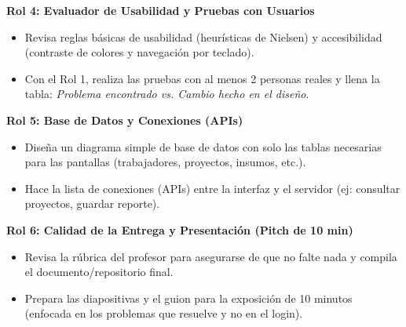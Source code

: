 \documentclass[11pt,letterpaper]{article}
\begin{document}
\begin{tcolorbox}
    \textbf{\color{primary}Rol 4: Evaluador de Usabilidad y Pruebas con Usuarios}
    \begin{itemize}
        \item Revisa reglas básicas de usabilidad (heurísticas de Nielsen) y accesibilidad (contraste de colores y navegación por teclado).
        \item Con el Rol 1, realiza las pruebas con al menos 2 personas reales y llena la tabla: \emph{Problema encontrado vs. Cambio hecho en el diseño}.
    \end{itemize}
\end{tcolorbox}

\begin{tcolorbox}
    \textbf{\color{primary}Rol 5: Base de Datos y Conexiones (APIs)}
    \begin{itemize}
        \item Diseña un diagrama simple de base de datos con solo las tablas necesarias para las pantallas (trabajadores, proyectos, insumos, etc.).
        \item Hace la lista de conexiones (APIs) entre la interfaz y el servidor (ej: consultar proyectos, guardar reporte).
    \end{itemize}
\end{tcolorbox}

\begin{tcolorbox}
    \textbf{\color{primary}Rol 6: Calidad de la Entrega y Presentación (Pitch de 10 min)}
    \begin{itemize}
        \item Revisa la rúbrica del profesor para asegurarse de que no falte nada y compila el documento/repositorio final.
        \item Prepara las diapositivas y el guion para la exposición de 10 minutos (enfocada en los problemas que resuelve y no en el login).
    \end{itemize}
\end{tcolorbox}
\end{document}
